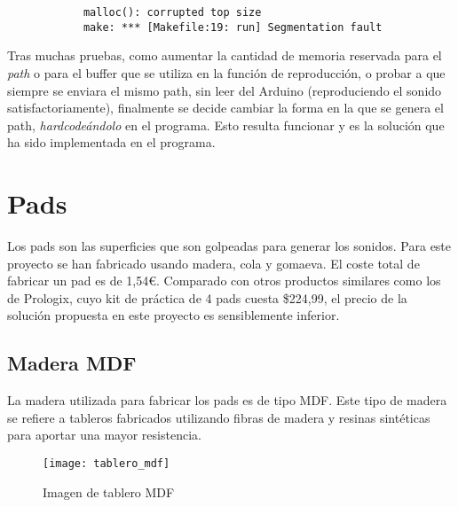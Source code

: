 \begin{itemize}
            \begin{verbatim}
            malloc(): corrupted top size
            make: *** [Makefile:19: run] Segmentation fault
            \end{verbatim}

            Tras muchas pruebas, como aumentar la cantidad de memoria reservada para el \textit{path} o para el
            buffer que se utiliza en la función de reproducción, o probar a que siempre se enviara el mismo path,
            sin leer del Arduino (reproduciendo el sonido satisfactoriamente), finalmente se decide cambiar la forma en
            la que se genera el path, \textit{hardcodeándolo} en el programa. Esto resulta funcionar y es la solución
            que ha sido implementada en el programa.
        \end{itemize}


    \section{Pads} %
    \label{sec:Pads}

        Los pads son las superficies que son golpeadas para generar los sonidos. Para este proyecto se han fabricado
        usando madera, cola y gomaeva\cite{GomaEva}. El coste total de fabricar un pad es de 1,54\euro{}. Comparado
        con otros productos similares como los de Prologix\cite{practice_pad}, cuyo kit de práctica de 4 pads cuesta
        \$224,99, el precio de la solución propuesta en este proyecto es sensiblemente inferior.

        \subsection{Madera MDF} %
        \label{sub:MaderaMDF}

            La madera utilizada para fabricar los pads es de tipo MDF. Este tipo de madera se refiere a tableros
            fabricados utilizando fibras de madera y resinas sintéticas para aportar una mayor
            resistencia.\cite{mdf_santana}

            \begin{figure}[ht]
                \centering
                \texttt{[image: tablero\_mdf]}
                \caption{Imagen de tablero MDF\label{fig:TableroMDF}}
            \end{figure}
        
